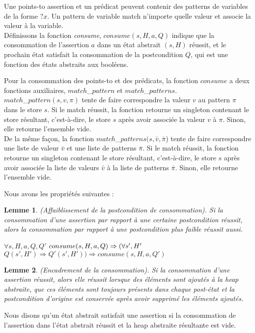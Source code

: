 \documentclass[9pt,openany]{book}
\newtheorem{lemme}{Lemme}
\begin{document}
	Une points-to assertion et un pr\'edicat peuvent contenir des patterns de variables de la forme $?x$. Un pattern de variable match n'importe quelle valeur et associe la valeur \`a la variable.\\
	D\'efinissons la fonction \textit{consume}, $consume(s,H,a,Q)$ indique que la consommation de l'assertion $a$ dans un \'etat abstrait $(s,H)$ r\'eussit, et le prochain \'etat satisfait la consommation de la postcondition $Q$, qui est une fonction des \'etats abstraits aux bool\'eens.\par
	Pour la consommation des points-to et des pr\'edicats, la fonction $consume$ a deux fonctions auxiliaires, $match$_$pattern$ et $match$_$patterns$.\\ $match$_$pattern(s,v,\pi)$ tente de faire correspondre la valeur $v$ au pattern $\pi$ dans le store $s$. Si le match r\'eussit, la fonction retourne un singleton contenant le store r\'esultant, c'est-\`a-dire, le store $s$ apr\`es avoir associ\'ee la valeur $v$ \`a $\pi$. Sinon, elle retourne l'ensemble vide.\\
	De la m\^eme fa\c{c}on, la fonction $match$_$patterns(s,\bar{v},\bar{\pi}$) tente de faire correspondre une liste de valeur $\bar{v}$ et une liste de patterns $\bar{\pi}$. Si le match r\'eussit, la fonction retourne un singleton contenant le store r\'esultant, c'est-\`a-dire, le store $s$ apr\`es avoir associ\'ee la liste de valeurs $\bar{v}$ \`a la liste de patterns $\bar{\pi}$. Sinon, elle retourne l'ensemble vide.\par
	
	Nous avons les propri\'et\'es suivantes :	
	
	\begin{lemme}
		(Affaiblissement de la postcondition de consommation). Si la consommation d'une assertion par rapport \`a une certaine postcondition  r\'eussit, alors la consommation par rapport \`a une postcondition plus faible r\'eussit aussi.\par
$\forall s,H,a,Q,Q'$ $consume(s,H,a,Q)\Rightarrow\\(\forall s', H'$ $Q(s',H')\Rightarrow Q'(s',H'))\Rightarrow consume(s,H,a,Q')$
	\end{lemme}
	
	\begin{lemme}
		(Encadrement de la consommation). Si la consommation d'une assertion r\'eussit, alors elle r\'eussit lorsque des \'el\'ements sont ajout\'es  \`a la heap abstraite, que ces \'el\'ements sont toujours pr\'esents dans chaque post-\'etat et la postcondition d'origine est conserv\'ee apr\`es avoir supprim\'e les \'el\'ements ajout\'es.
	\end{lemme}
	Nous disons qu'un \'etat abstrait satisfait une assertion si la consommation de l'assertion dans l'\'etat abstrait r\'eussit et la heap abstraite r\'esultante est vide.\\
	
\end{document}
